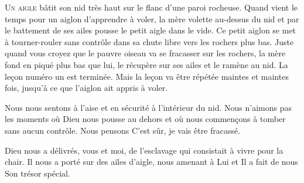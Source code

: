 


\lettrine{U}{n aigle} bâtit son nid très haut
 sur le flanc d'une paroi rocheuse.
 Quand vient le temps pour un aiglon d'apprendre à voler,
 la mère volette au-dessus du nid et par le battement de ses ailes
 pousse le petit aigle dans le vide.
 Ce petit aiglon se met à tourner-rouler sans contrôle
 dans sa chute libre vers les rochers plus bas.
 Juste quand vous croyez que le pauvre oiseau va se fracasser sur les rochers,
 la mère fond en piqué plus bas que lui, le récupère sur ses ailes
 et le ramène au nid.
 La le\c{c}on numéro un est terminée.
 Mais la le\c{c}on va être répétée maintes et maintes fois,
 jusqu'à ce que l'aiglon ait appris à voler.

Nous nous sentons à l'aise et en sécurité à l'intérieur du nid.
 Nous n'aimons pas les moments où Dieu nous pousse au dehors
 et où nous commen\c{c}ons à tomber sans aucun contrôle.
 Nous pensons\frcolon{} \Og C'est sûr, je vais être fracassé. \Fg{}


Dieu nous a délivrés, vous et moi, de l'esclavage
 qui consistait à vivre pour la chair.
 Il nous a porté sur des ailes d'aigle, nous amenant à Lui
 et Il a fait de nous Son trésor spécial. 

\dvrule




